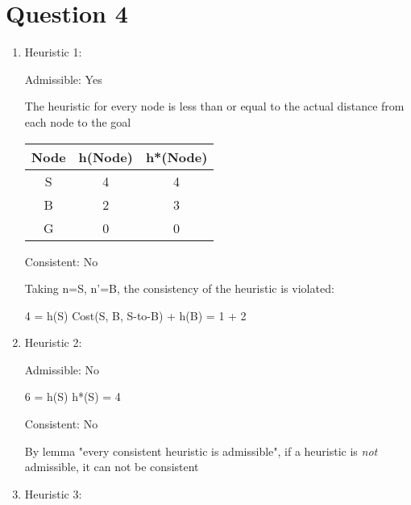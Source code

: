 \documentclass{article}
\begin{document}
    \section*{Question 4}
    \begin{enumerate}
        \item Heuristic 1:
        
        Admissible: Yes
        
        The heuristic for every node is less than or equal to the actual distance from each node to the goal
        \newline
        \newline
        \begin{left}
            \begin{tabular}{c|c|c}
            \hline
                Node & h(Node) & h*(Node) \\
            \hline
                S & 4 & 4\\
                B & 2 & 3\\
                G & 0 & 0 \\
            \hline
            \end{tabular}
        \end{left}
        \newline
        \newline
        
        Consistent: No
        
        Taking n=S, n'=B, the consistency of the heuristic is violated:
        
        4 = h(S) \nleq Cost(S, B, S-to-B) + h(B) = 1 + 2
        \newline
        \newline
        
        
        \item Heuristic 2:
        
        Admissible: No
        
        6 = h(S) \nleq h*(S) = 4
        \newline
        \newline
        
        Consistent: No
        
        By lemma "every consistent heuristic is admissible", if a heuristic is \emph{not} admissible, it can not be consistent
        \newline
        \newline
        
        
        \item Heuristic 3:
        

\end{enumerate}
\end{document}
